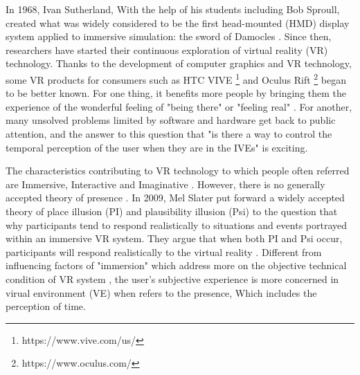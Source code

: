 \documentclass[sigconf]{acmart}
\begin{document}
In 1968, Ivan Sutherland, With the help of his students including Bob Sproull, created what was widely considered to be the first head-mounted (HMD) display system applied to immersive simulation: the sword of Damocles \cite{sutherland1968head}. Since then, researchers have started their continuous exploration of virtual reality (VR) technology. Thanks to the development of computer graphics and VR technology, some VR products for consumers such as HTC VIVE \footnote[1]{https://www.vive.com/us/}  and Oculus Rift \footnote[2]{https://www.oculus.com/} began to be better known. For one thing, it benefits more people by bringing them the experience of the wonderful feeling of "being there" \cite{held1992telepresence,sheridan1992musings,barfield1993sense,slater1997framework,draper1998telepresence,bystrom1999conceptual,sanchez2005presence} or "feeling real" \cite{parola2016turning}. For another, many unsolved problems limited by software and hardware get back to public attention, and the answer to this question that "is there a way to control the temporal perception of the user when they are in the IVEs" is exciting.


The characteristics contributing to VR technology to which people often referred are Immersive, Interactive and Imaginative \cite{Burdea:1994:VRT:177812}. However, there is no generally accepted theory of presence \cite{ijsselsteijn2000presence,birkenbusch2013concepts,skarbez2016plausibility,darken1999quantitative}. In 2009, Mel Slater put forward a widely accepted theory of place illusion (PI) and plausibility illusion (Psi) to the question that why participants tend to respond realistically to situations and events portrayed within an immersive VR system. They argue that when both PI and Psi occur, participants will respond realistically to the virtual reality \cite{slater2009place}. Different from influencing factors of "immersion" which address more on the objective technical condition of VR system \cite{bowman2007virtual,slater1999measuring,riva2011intention,slater1997framework}, the user's subjective experience is more concerned in virual environment (VE) when refers to the presence, Which includes the perception of time.
\end{document}
